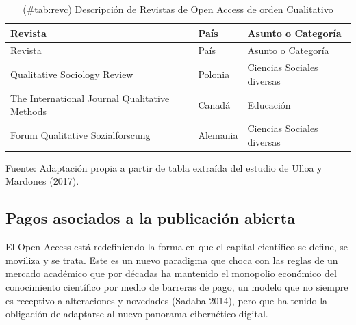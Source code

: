 \documentclass[
  spanish,
  letterpaper,
  DIV=11,
  numbers=noendperiod]{scrreprt}
\begin{document}
\begin{longtable}[]{@{}
  >{\raggedright\arraybackslash}p{}
  >{\raggedright\arraybackslash}p{}
  >{\raggedright\arraybackslash}p{}@{}}
\caption{(\#tab:revc) Descripción de Revistas de Open Access de orden
Cualitativo}\tabularnewline
\toprule\noalign{}
\begin{minipage}[b]{\linewidth}\raggedright
Revista
\end{minipage} & \begin{minipage}[b]{\linewidth}\raggedright
País
\end{minipage} & \begin{minipage}[b]{\linewidth}\raggedright
Asunto o Categoría
\end{minipage} \\
\midrule\noalign{}
\endfirsthead
\toprule\noalign{}
\begin{minipage}[b]{\linewidth}\raggedright
Revista
\end{minipage} & \begin{minipage}[b]{\linewidth}\raggedright
País
\end{minipage} & \begin{minipage}[b]{\linewidth}\raggedright
Asunto o Categoría
\end{minipage} \\
\midrule\noalign{}
\endhead
\bottomrule\noalign{}
\endlastfoot
\href{http://www.qualitativesociologyreview.org}{Qualitative Sociology
Review} & Polonia & Ciencias Sociales diversas \\
\href{https://journals.sagepub.com/home/ijq}{The International Journal
Qualitative Methods} & Canadá & Educación \\
\href{https://www.qualitative-research.net/index.php/fqs}{Forum
Qualitative Sozialforscung} & Alemania & Ciencias Sociales diversas \\
\end{longtable}

Fuente: Adaptación propia a partir de tabla extraída del estudio de
Ulloa y Mardones (2017).

\subsection{Pagos asociados a la publicación
abierta}\label{pagos-asociados-a-la-publicaciuxf3n-abierta}

El Open Access está redefiniendo la forma en que el capital científico
se define, se moviliza y se trata. Este es un nuevo paradigma que choca
con las reglas de un mercado académico que por décadas ha mantenido el
monopolio económico del conocimiento científico por medio de barreras de
pago, un modelo que no siempre es receptivo a alteraciones y novedades
(Sadaba 2014), pero que ha tenido la obligación de adaptarse al nuevo
panorama cibernético digital.
\end{document}
